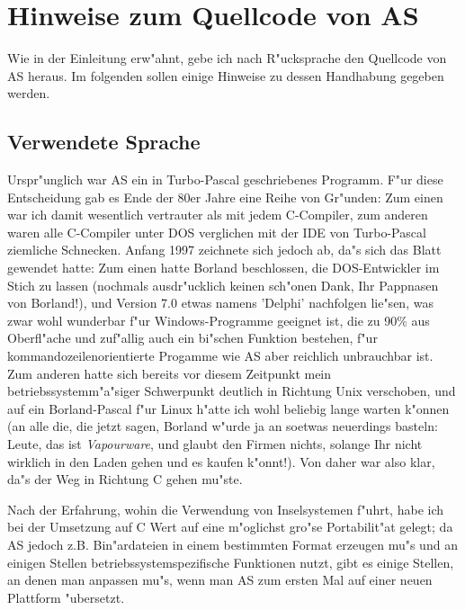 \documentclass[12pt,a4paper,twoside]{report}
\begin{document}
{%

\cleardoublepage
\chapter{Hinweise zum Quellcode von AS}
\label{ChapSource}

Wie in der Einleitung erw"ahnt, gebe ich nach R"ucksprache den Quellcode
von AS heraus.  Im folgenden sollen einige Hinweise zu dessen Handhabung
gegeben werden.


\section{Verwendete Sprache}

Urspr"unglich war AS ein in Turbo-Pascal geschriebenes Programm.  F"ur
diese Entscheidung gab es Ende der 80er Jahre eine Reihe von Gr"unden:
Zum einen war ich damit wesentlich vertrauter als mit jedem C-Compiler,
zum anderen waren alle C-Compiler unter DOS verglichen mit der IDE von
Turbo-Pascal ziemliche Schnecken.  Anfang 1997 zeichnete sich jedoch ab,
da"s sich das Blatt gewendet hatte: Zum einen hatte Borland beschlossen,
die DOS-Entwickler im Stich zu lassen (nochmals ausdr"ucklich keinen
sch"onen Dank, Ihr Pappnasen von Borland!), und Version 7.0 etwas namens
'Delphi' nachfolgen lie"sen, was zwar wohl wunderbar f"ur
Windows-Programme geeignet ist, die zu 90\% aus Oberfl"ache und zuf"allig
auch ein bi"schen Funktion bestehen, f"ur kommandozeilenorientierte
Progamme wie AS aber reichlich unbrauchbar ist.  Zum anderen hatte sich
bereits vor diesem Zeitpunkt mein betriebssystemm"a"siger Schwerpunkt
deutlich in Richtung Unix verschoben, und auf ein Borland-Pascal f"ur
Linux h"atte ich wohl beliebig lange warten k"onnen (an alle die, die
jetzt sagen, Borland w"urde ja an soetwas neuerdings basteln: Leute, das
ist {\em Vapourware}, und glaubt den Firmen nichts, solange Ihr nicht
wirklich in den Laden gehen und es kaufen k"onnt!).  Von daher war also
klar, da"s der Weg in Richtung C gehen mu"ste.

Nach der Erfahrung, wohin die Verwendung von Inselsystemen f"uhrt, habe
ich bei der Umsetzung auf C Wert auf eine m"oglichst gro"se Portabilit"at
gelegt; da AS jedoch z.B. Bin"ardateien in einem bestimmten Format
erzeugen mu"s und an einigen Stellen betriebssystemspezifische Funktionen
nutzt, gibt es einige Stellen, an denen man anpassen mu"s, wenn man AS zum
ersten Mal auf einer neuen Plattform "ubersetzt.

}
\end{document}
